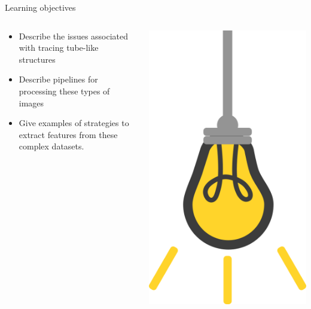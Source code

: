 \documentclass[9pt, aspectratio=169]{beamer}
\begin{document}
\begin{frame}
    {Learning objectives}
    \begin{columns}
        \begin{column}{0.8\textwidth}
            \begin{itemize}
                \item Describe the issues associated with tracing tube-like structures
                \item Describe pipelines for processing these types of images
                \item Give examples of strategies to extract features from these complex datasets.
            \end{itemize}
        \end{column}
        \begin{column}{0.2\textwidth}
            \includegraphics[angle=-30, origin=tr, width=1.5\textwidth]{lightbulb.png}
        \end{column}
    \end{columns}
\end{frame}
\end{document}
